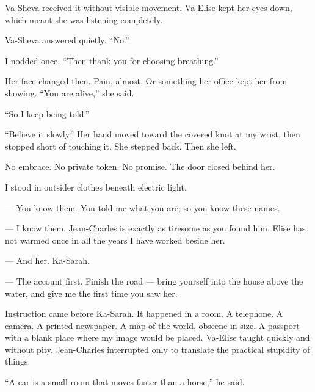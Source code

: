 Va-Sheva received it without visible movement. Va-Elise kept her eyes down, which meant she was listening completely.\par

Va-Sheva answered quietly. ``No.''\par

I nodded once. ``Then thank you for choosing breathing.''\par

Her face changed then. Pain, almost. Or something her office kept her from showing. ``You are alive,'' she said.\par

``So I keep being told.''\par

``Believe it slowly.'' Her hand moved toward the covered knot at my wrist, then stopped short of touching it. She stepped back. Then she left.\par

No embrace. No private token. No promise. The door closed behind her.\par

I stood in outsider clothes beneath electric light.\par

\ornament

\begin{room}

--- You know them. You told me what you are; so you know these names.

--- I know them. Jean-Charles is exactly as tiresome as you found him. Elise has not warmed once in all the years I have worked beside her.

--- And her. Ka-Sarah.

--- The account first. Finish the road --- bring yourself into the house above the water, and give me the first time you saw her.

\end{room}

\ornament

Instruction came before Ka-Sarah. It happened in a room. A telephone. A camera. A printed newspaper. A map of the world, obscene in size. A passport with a blank place where my image would be placed. Va-Elise taught quickly and without pity. Jean-Charles interrupted only to translate the practical stupidity of things.\par

``A car is a small room that moves faster than a horse,'' he said.\par

